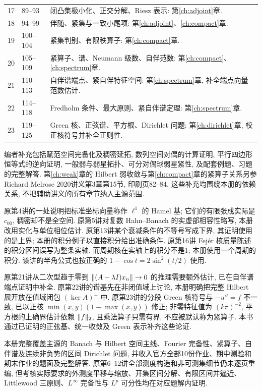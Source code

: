 \begin{longtable}{p{10mm}p{20mm}p{125mm}}
17 & 89--93 & 闭凸集极小化、正交分解、Riesz 表示: 第\ref{ch:adjoint}章.\\
18 & 94--99 & 伴随、紧集与一致小尾项: 第\ref{ch:adjoint}、\ref{ch:compact}章.\\
19 & 100--104 & 紧集判别、有限秩算子: 第\ref{ch:compact}章.\\
20 & 105--109 & 紧算子、谱、Neumann 级数、自伴范数: 第\ref{ch:compact}、\ref{ch:spectrum}章.\\
21 & 110--113 & 自伴谱端点、紧自伴特征空间: 第\ref{ch:spectrum}章, 补全端点向量范数估计.\\
22 & 114--118 & Fredholm 条件、最大原则、紧自伴谱定理: 第\ref{ch:spectrum}章.\\
23 & 119--125 & Green 核、正弦谱、平方根、Dirichlet 问题: 第\ref{ch:dirichlet}章, 校正核符号并补全正则性.\\
\bottomrule
\end{longtable}

编者补充包括赋范空间完备化及稠密延拓, 数列空间对偶的计算证明, 平行四边形恒等式的逆向证明, 一般弱与弱星拓扑、可分对偶球弱星紧性, 及配套例题、习题的完整解答. 第\ref{ch:weak}章的 Hilbert 弱收敛与第\ref{ch:compact}章的紧算子关系另参 Richard Melrose 2020讲义第3章第15节, 印刷页82--84. 这些补充均围绕本册的依赖关系, 不把辅助讲义的所有章节纳入主源范围.

原第4讲的一处说明把标准坐标向量称作 $\ell^1$ 的 Hamel 基; 它们的有限张成实际是 $c_{00}$, 稠密却不是全空间. 原第5讲对复数 Hahn--Banach 的实虚部相容性略写, 本册改用实化与单位相位估计. 原第13讲某个衰减条件的不等号写成下界, 其证明使用的是上界; 本册的积分例子以直接积分给出准确条件. 原第16讲 Fejér 核质量陈述的积分区间误写为整条实轴, 而周期核在实轴上的积分不是1; 本册使用一个周期的积分. 该讲的半角公式也按正确的 $1-\cos t=2\sin^2(t/2)$ 使用.

原第21讲从二次型趋于零到 $\lVert (A-\lambda I)x_n\rVert\to0$ 的推理需要额外估计, 已在自伴谱端点证明中补全. 原第22讲的谱基先在非闭值域上讨论, 本册明确把完整 Hilbert 展开放在值域闭包 $(\ker A)^\perp$ 中. 原第23讲的分段 Green 核符号与 $-u''=f$ 不一致, 已以正核 $\min(x,y)(1-\max(x,y))$ 修正; 非零特征值为 $(k\pi)^{-2}$, 平方根的上确界估计依赖 $\lVert f\rVert_2$, 且乘法算子只需有界, 不应被默认称为紧算子. 本书通过已证明的正弦基、统一收敛及 Green 表示补齐这些论证.

本册完整覆盖主源的 Banach 与 Hilbert 空间主线、Fourier 完备性、紧算子、自伴谱及连续非负势的区间 Dirichlet 问题, 并收入官方全部10份作业、期中测验和期末作业的题面及完整解答. 原第6--12讲全部测度构造和非可测集细节仍未逐页重编, 但考核实际要求的外测度平移与缩放、开集区间分解、有限区间并逼近、Littlewood 三原则、$L^\infty$ 完备性与 $L^p$ 可分性均在对应题解内证明.

